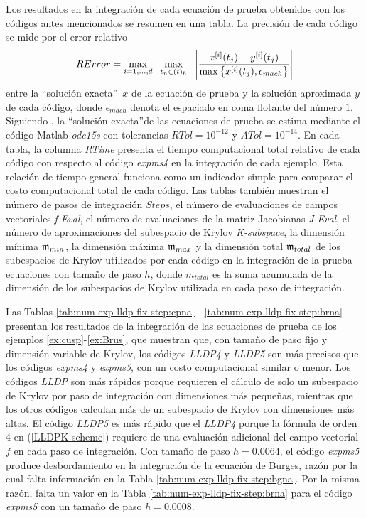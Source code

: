 Los resultados en la integración de cada ecuación de prueba obtenidos con los códigos antes mencionados se resumen en una tabla. La precisión de cada código se mide por el error relativo
\begin{equation}\label{num-exp-lldp-fix-step:ER}
	RError = \max_{i=1,\ldots,d} \;\ \max_{t_n\in(t)_h}  \;\ \left\lvert\frac{x^{[i]}(t_j)-y^{[i]}(t_j)}{\maxx{x^{[i]}(t_j),\epsilon_{mach}}}\right\rvert
\end{equation}
entre la \textquotedblleft solución exacta\textquotedblright~$x$ de la ecuación de prueba y la solución aproximada $y$ de cada código, donde $\epsilon_{mach}$ denota el espaciado en coma flotante del número $1$. Siguiendo \cite{tokman2006efficient}, la \textquotedblleft solución exacta\textquotedblright de las ecuaciones de prueba se estima mediante el código Matlab \textit{ode15s} con tolerancias $RTol=10^{-12}$ y $ATol=10^{-14}$. En cada tabla, la columna \textit{RTime} presenta el tiempo computacional total relativo de cada código con respecto al código \emph{expms4} en la integración de cada ejemplo. Esta relación de tiempo general funciona como un indicador simple para comparar el costo computacional total de cada código. Las tablas también muestran el número de pasos de integración $Steps$, el número de evaluaciones de campos vectoriales \textit{f-Eval}, el número de evaluaciones de la matriz Jacobianas \textit{J-Eval}, el número de aproximaciones del subespacio de Krylov \textit{K-subspace}, la dimensión mínima $\mathfrak{m}_{min}$, la dimensión máxima $\mathfrak{m}_{max}$ y la dimensión total $\mathfrak{m}_{total}$ de los subespacios de Krylov utilizados por cada código en la integración de la prueba ecuaciones con tamaño de paso $h$, donde $m_{total}$ es la suma acumulada de la dimensión de los subespacios de Krylov utilizada en cada paso de integración.

Las Tablas \ref{tab:num-exp-lldp-fix-step:cpna} - \ref{tab:num-exp-lldp-fix-step:brna} presentan los resultados de la integración de las ecuaciones de prueba de los ejemplos \ref{ex:cusp}-\ref{ex:Brus}, que muestran que, con tamaño de paso fijo y dimensión variable de Krylov, los códigos \emph{LLDP4} y \emph{LLDP5} son más precisos que los códigos \emph{expms4} y \emph{expms5}, con un costo computacional similar o menor. Los códigos \emph{LLDP} son más rápidos porque requieren el cálculo de solo un subespacio de Krylov por paso de integración con dimensiones más pequeñas, mientras que los otros códigos calculan más de un subespacio de Krylov con dimensiones más altas. El código \emph{LLDP5} es más rápido que el \emph{LLDP4} porque la fórmula de orden 4 en (\ref{LLDPK scheme}) requiere de una evaluación adicional del campo vectorial $f$ en cada paso de integración. Con tamaño de paso $h = 0.0064$, el código \emph{expms5} produce desbordamiento en la integración de la ecuación de Burges, razón por la cual falta información en la Tabla \ref{tab:num-exp-lldp-fix-step:bgna}. Por la misma razón, falta un valor en la Tabla \ref{tab:num-exp-lldp-fix-step:brna} para el código \emph{expms5} con un tamaño de paso $h = 0.0008$.

